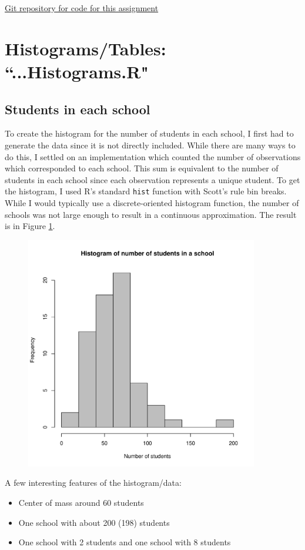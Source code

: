 \documentclass{article}
\begin{document}
\hyperref{https://github.com/patricksheehan/19704}{}{}{Git repository for code for this assignment}

\section{Histograms/Tables: ``...Histograms.R"}
\subsection{Students in each school}
To create the histogram for the number of students in each school, I first had to generate the data since it is not directly included. While there are many ways to do this, I settled on an implementation which counted the number of observations which corresponded to each school. This sum is equivalent to the number of students in each school since each observation represents a unique student. To get the histogram, I used R's standard \verb|hist| function with Scott's rule bin breaks. While I would typically use a discrete-oriented histogram function, the number of schools was not large enough to result in a continuous approximation. The result is in Figure \ref{hist1}.

\begin{figure}[H]
\centering
\includegraphics[width = 4in]{figures/histogram_1.pdf}
\caption{}
\label{hist1}
\end{figure}

A few interesting features of the histogram/data:
\begin{itemize}
\item Center of mass around 60 students
\item One school with about 200 (198) students
\item One school with 2 students and one school with 8 students
\end{itemize}
\end{document}

